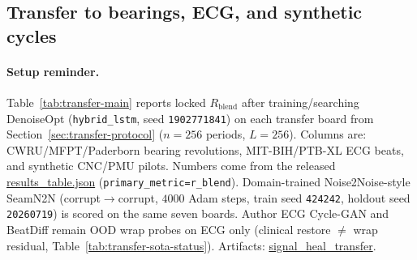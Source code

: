 \subsection{Transfer to bearings, ECG, and synthetic cycles}
\label{sec:transfer-main}

\paragraph{Setup reminder.}
Table~\ref{tab:transfer-main} reports locked $R_{\mathrm{blend}}$ after training/searching DenoiseOpt
(\texttt{hybrid\_lstm}, seed \texttt{1902771841}) on each transfer board
from Section~\ref{sec:transfer-protocol} ($n{=}256$ periods, $L{=}256$).
Columns are: CWRU/MFPT/Paderborn bearing revolutions, MIT-BIH/PTB-XL ECG beats, and synthetic CNC/PMU pilots.
Numbers come from the released
\href{https://github.com/reeldemo/reelsynth/blob/main/brand/artifacts/signal_heal_transfer/results_table.json}{results\_table.json}
(\texttt{primary\_metric=r\_blend}).
Domain-trained Noise2Noise-style SeamN2N (corrupt$\to$corrupt, $4000$ Adam steps, train seed \texttt{424242}, holdout seed \texttt{20260719})
is scored on the same seven boards.
Author ECG Cycle-GAN and BeatDiff remain OOD wrap probes on ECG only
(clinical restore $\neq$ wrap residual, Table~\ref{tab:transfer-sota-status}).
Artifacts:
\href{https://github.com/reeldemo/reelsynth/tree/main/brand/artifacts/signal_heal_transfer}{signal\_heal\_transfer}.

